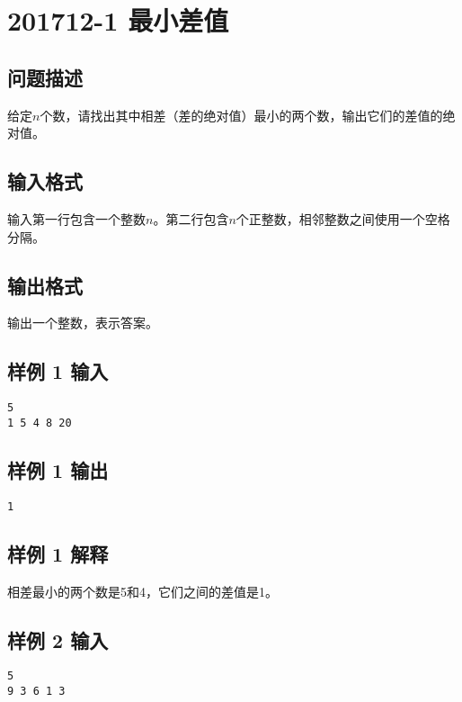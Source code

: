 \section{201712-1 最小差值}

\subsection{问题描述}

给定$n$个数，请找出其中相差（差的绝对值）最小的两个数，输出它们的差值的绝对值。

\subsection{输入格式}

输入第一行包含一个整数$n$。第二行包含$n$个正整数，相邻整数之间使用一个空格分隔。

\subsection{输出格式}

输出一个整数，表示答案。

\subsection{样例 1 输入}

\begin{lstlisting}[numbers=none]
5
1 5 4 8 20
\end{lstlisting}

\subsection{样例 1 输出}

\begin{lstlisting}[numbers=none]
1
\end{lstlisting}

\subsection{样例 1 解释}

相差最小的两个数是5和4，它们之间的差值是1。

\subsection{样例 2 输入}

\begin{lstlisting}[numbers=none]
5
9 3 6 1 3
\end{lstlisting}

